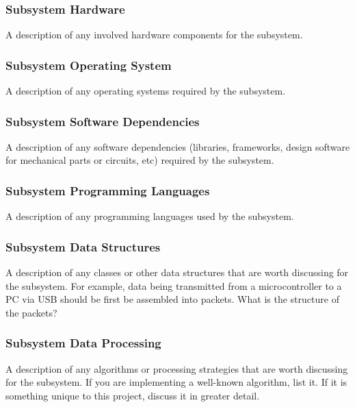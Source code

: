 \subsubsection{Subsystem Hardware}
A description of any involved hardware components for the subsystem.

\subsubsection{Subsystem Operating System}
A description of any operating systems required by the subsystem.

\subsubsection{Subsystem Software Dependencies}
A description of any software dependencies (libraries, frameworks, design software for mechanical parts or circuits, etc) required by the subsystem.

\subsubsection{Subsystem Programming Languages}
A description of any programming languages used by the subsystem.

\subsubsection{Subsystem Data Structures}
A description of any classes or other data structures that are worth discussing for the subsystem. For example, data being transmitted from a microcontroller to a PC via USB should be first be assembled into packets. What is the structure of the packets?

\subsubsection{Subsystem Data Processing}
A description of any algorithms or processing strategies that are worth discussing for the subsystem. If you are implementing a well-known algorithm, list it. If it is something unique to this project, discuss it in greater detail.


